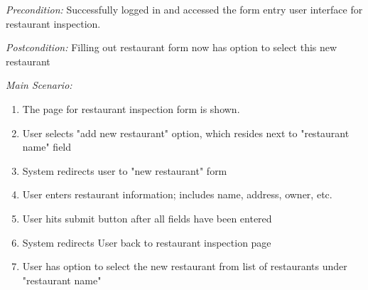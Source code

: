 \documentclass[twoside,letterpaper]{article}
\begin{document}
{\color{black} \textit{Precondition:} Successfully logged in and accessed the form entry user interface for restaurant inspection.}

{\color{black} \textit{Postcondition:}  Filling out restaurant form now has option to select this new restaurant}
\newline

{\color{black} \textit{Main Scenario:}}
\begin{enumerate}
\item The page for restaurant inspection form is shown.

\item User selects "add new restaurant" option, which resides next to "restaurant name" field

\item System redirects user to "new restaurant" form

\item User enters restaurant information; includes name, address, owner, etc.

\item User hits submit button after all fields have been entered

\item System redirects User back to restaurant inspection page

\item User has option to select the new restaurant from list of restaurants under "restaurant name"

\end{enumerate}
\end{document}
